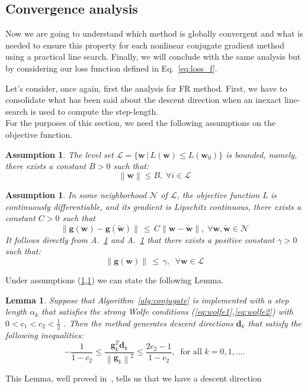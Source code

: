 \documentclass[11pt]{article}
\newtheorem{lemma}[theorem]{Lemma}
\newtheorem{assumption}[theorem]{Assumption}
\newcommand{\norm}[1]{\left\lVert#1\right\rVert}
\begin{document}
\subsection{Convergence analysis}
\label{sec:ncg_global_convergence}
Now we are going to understand which method is globally convergent and what is needed to ensure this property for each nonlinear conjugate gradient method using a practical line search. Finally, we will conclude with the same analysis but by considering our loss function defined in Eq.~\ref{eq:loss_f}.

Let's consider, once again, first the analysis for FR method. First, we have to consolidate what has been said about the descent direction when an inexact line-search is used to compute the step-length.\\

\noindent For the purposes of this section, we need the following assumptions on the objective function.
\begin{assumption}
\label{as:1}
The level set $\mathcal{L} = \{ \mathbf{w}\, | \, L(\mathbf{w}) \leq L(\mathbf{w}_0)\}$ is bounded, namely, there exists a constant $B > 0$ such that:
$$ \norm{\mathbf{w}} \leq B, \; \forall i \in \mathcal{L}$$ 
\end{assumption}
\begin{assumption}
\label{as:2}
    In some neighborhood $\mathcal{N}$ of $\mathcal{L}$, the objective function L is continuously differentiable, and its gradient is Lipschitz continuous, there exists a constant $C > 0$ such that 
    $$
      \|\mathbf{g}(\textbf{w}) - \mathbf{g}(\tilde{\textbf{w}})\| \, \leq \,  C \| \mathbf{w} - \tilde{\mathbf{w}}\|,\; \forall \mathbf{w}, \tilde{\mathbf{w}} \in \mathcal{N}
    $$
    It follows directly from A.~\ref{as:1} and A.~\ref{as:2} that there exists a positive constant $\gamma>0$ such that:
    $$\norm{\mathbf{g}(\textbf{w})} \, \leq\, \gamma, \;\; \forall \mathbf{w} \in \mathcal{L} $$
\end{assumption}
Under assumptions (\ref{as:1},\ref{as:2}) we can state the following Lemma.
\begin{lemma}
\label{lemma:descent_dir}
Suppose that Algorithm~\ref{alg:conjugate} is implemented with a step length $\alpha_k$ that satisfies the strong
Wolfe conditions (\ref{eq:wolfe1},\ref{eq:wolfe2}) with $0 < c_1 < c_2 < \frac{1}{2}$ . Then the method generates descent directions $\mathbf{d}_k$
that satisfy the following inequalities:
\begin{equation}
    -\frac{1}{1-c_2} \leq \frac{\mathbf{g}_k^T\mathbf{d}_k}{\norm{\mathbf{g}_k}^2} \leq \frac{2c_2 - 1}{1 -c_2},\; \; \text{for all $k = 0,1, ....$}
\label{eq:lemma_descent_dir}
\end{equation}
\end{lemma}
This Lemma, well proved in~\cite{Nocedal}, tells us that we have a descent direction\\
\end{document}

